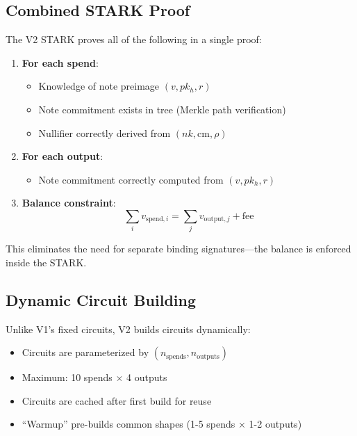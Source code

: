 \documentclass[11pt,a4paper]{article}
\begin{document}
\subsection{Combined STARK Proof}

The V2 STARK proves all of the following in a single proof:

\begin{enumerate}
    \item \textbf{For each spend}:
    \begin{itemize}
        \item Knowledge of note preimage $(v, pk_h, r)$
        \item Note commitment exists in tree (Merkle path verification)
        \item Nullifier correctly derived from $(nk, \text{cm}, \rho)$
    \end{itemize}

    \item \textbf{For each output}:
    \begin{itemize}
        \item Note commitment correctly computed from $(v, pk_h, r)$
    \end{itemize}

    \item \textbf{Balance constraint}:
    \begin{equation}
    \sum_i v_{\text{spend},i} = \sum_j v_{\text{output},j} + \text{fee}
    \end{equation}
\end{enumerate}

This eliminates the need for separate binding signatures---the balance is enforced inside the STARK.

\subsection{Dynamic Circuit Building}

Unlike V1's fixed circuits, V2 builds circuits dynamically:

\begin{itemize}
    \item Circuits are parameterized by $(n_{\text{spends}}, n_{\text{outputs}})$
    \item Maximum: 10 spends $\times$ 4 outputs
    \item Circuits are cached after first build for reuse
    \item ``Warmup'' pre-builds common shapes (1-5 spends $\times$ 1-2 outputs)
\end{itemize}
\end{document}
